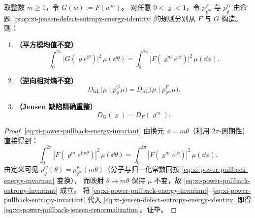 \begin{proposition}[幂映射拉回下的能量项与熵项不变]\label{prop:xi-jensen-defect-power-pullback-invariance}
取整数 \(m\ge 1\)，令 \(G(w):=F(w^m)\)。
对任意 \(0<\varrho<1\)，令 \(p^F_{\varrho^m}\) 与 \(p^G_\varrho\) 由命题 \ref{prop:xi-jensen-defect-entropy-energy-identity} 的规则分别从 \(F\) 与 \(G\) 构造。
则：
\begin{enumerate}
  \item \textbf{（平方模均值不变）}
  \begin{equation}\label{eq:xi-power-pullback-energy-invariant}
  \int_{0}^{2\pi}\bigl|G(\varrho e^{\mathrm{i}\theta})\bigr|^2\,\mu(\dd\theta)
  =\int_{0}^{2\pi}\bigl|F(\varrho^m e^{\mathrm{i}\phi})\bigr|^2\,\mu(\dd\phi).
  \end{equation}
  \item \textbf{（逆向相对熵不变）}
  \begin{equation}\label{eq:xi-power-pullback-entropy-invariant}
  D_{\mathrm{KL}}\!\bigl(\mu\mid p^G_\varrho\mu\bigr)=D_{\mathrm{KL}}\!\bigl(\mu\mid p^F_{\varrho^m}\mu\bigr).
  \end{equation}
  \item \textbf{（Jensen 缺陷精确重整）}
  \begin{equation}\label{eq:xi-power-pullback-jensen-renormalization}
  D_G(\varrho)=D_F(\varrho^m).
  \end{equation}
\end{enumerate}
\end{proposition}

\begin{proof}
\eqref{eq:xi-power-pullback-energy-invariant} 由换元 \(\phi=m\theta\)（利用 \(2\pi\)-周期性）直接得到：
\[
\int_0^{2\pi}|F(\varrho^m e^{\mathrm{i}m\theta})|^2\,\mu(\dd\theta)
=\int_0^{2\pi}|F(\varrho^m e^{\mathrm{i}\phi})|^2\,\mu(\dd\phi).
\]
由定义可见 \(p^G_\varrho(\theta)=p^F_{\varrho^m}(m\theta)\)（分子与归一化常数同按 \eqref{eq:xi-power-pullback-energy-invariant} 变换），
而映射 \(\theta\mapsto m\theta\) 保持 \(\mu\) 不变，故 \eqref{eq:xi-power-pullback-entropy-invariant} 成立。
将 \eqref{eq:xi-power-pullback-energy-invariant}--\eqref{eq:xi-power-pullback-entropy-invariant} 代入 \eqref{eq:xi-jensen-defect-entropy-energy-identity} 即得 \eqref{eq:xi-power-pullback-jensen-renormalization}。证毕。
\end{proof}

